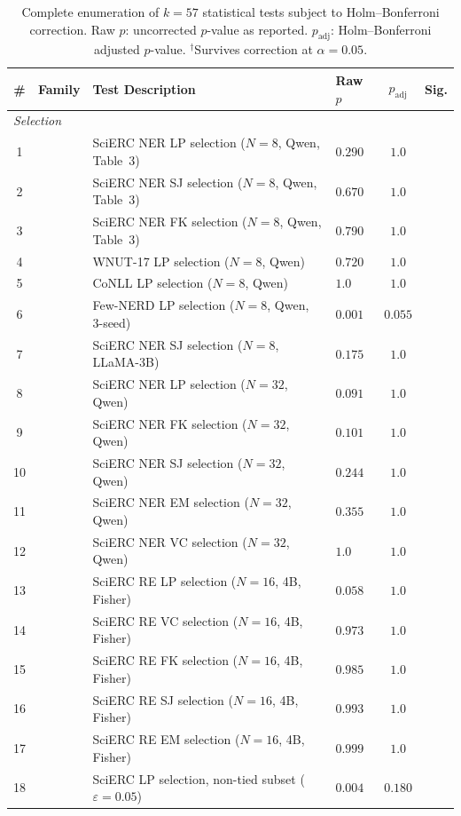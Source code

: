 \begin{table}[t]
\centering
\small
\caption{Complete enumeration of $k{=}57$ statistical tests subject to Holm--Bonferroni correction. Raw $p$: uncorrected $p$-value as reported. $p_{\text{adj}}$: Holm--Bonferroni adjusted $p$-value. $^\dagger$Survives correction at $\alpha{=}0.05$.}
\label{tab:holm_family}
\begin{tabular}{clllcc}
\toprule
\# & Family & Test Description & Raw $p$ & $p_{\text{adj}}$ & Sig. \\
\midrule
\multicolumn{6}{l}{\textit{Selection}} \\
1 & & SciERC NER LP selection ($N{=}8$, Qwen, Table~3) & $0.290$ & $1.0$ &  \\
2 & & SciERC NER SJ selection ($N{=}8$, Qwen, Table~3) & $0.670$ & $1.0$ &  \\
3 & & SciERC NER FK selection ($N{=}8$, Qwen, Table~3) & $0.790$ & $1.0$ &  \\
4 & & WNUT-17 LP selection ($N{=}8$, Qwen) & $0.720$ & $1.0$ &  \\
5 & & CoNLL LP selection ($N{=}8$, Qwen) & $1.0$ & $1.0$ &  \\
6 & & Few-NERD LP selection ($N{=}8$, Qwen, 3-seed) & $0.001$ & $0.055$ &  \\
7 & & SciERC NER SJ selection ($N{=}8$, LLaMA-3B) & $0.175$ & $1.0$ &  \\
8 & & SciERC NER LP selection ($N{=}32$, Qwen) & $0.091$ & $1.0$ &  \\
9 & & SciERC NER FK selection ($N{=}32$, Qwen) & $0.101$ & $1.0$ &  \\
10 & & SciERC NER SJ selection ($N{=}32$, Qwen) & $0.244$ & $1.0$ &  \\
11 & & SciERC NER EM selection ($N{=}32$, Qwen) & $0.355$ & $1.0$ &  \\
12 & & SciERC NER VC selection ($N{=}32$, Qwen) & $1.0$ & $1.0$ &  \\
13 & & SciERC RE LP selection ($N{=}16$, 4B, Fisher) & $0.058$ & $1.0$ &  \\
14 & & SciERC RE VC selection ($N{=}16$, 4B, Fisher) & $0.973$ & $1.0$ &  \\
15 & & SciERC RE FK selection ($N{=}16$, 4B, Fisher) & $0.985$ & $1.0$ &  \\
16 & & SciERC RE SJ selection ($N{=}16$, 4B, Fisher) & $0.993$ & $1.0$ &  \\
17 & & SciERC RE EM selection ($N{=}16$, 4B, Fisher) & $0.999$ & $1.0$ &  \\
18 & & SciERC LP selection, non-tied subset ($\varepsilon{=}0.05$) & $0.004$ & $0.180$ &  \\

\end{tabular}
\end{table}
